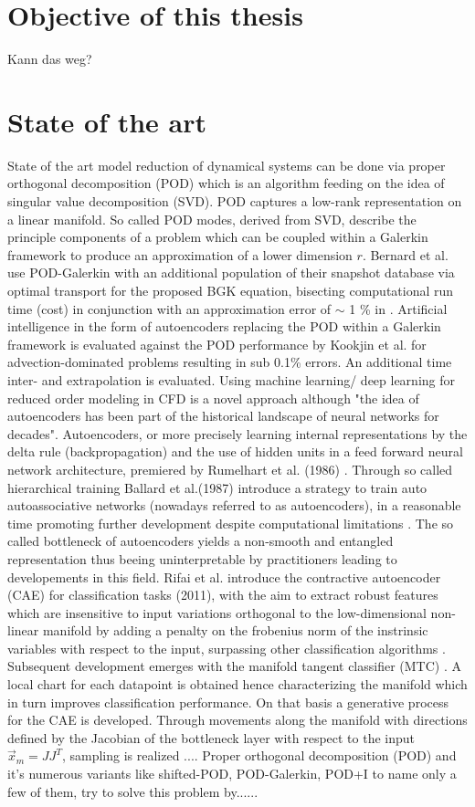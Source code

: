 \section{Objective of this thesis}
Kann das weg?
\section{State of the art}
State of the art model reduction of dynamical systems can be done via proper orthogonal decomposition (POD) which is an algorithm feeding on the idea of singular value decomposition (SVD)\cite{Franz}\cite{Kutz}. POD captures a low-rank representation on a linear manifold. So called POD modes, derived from SVD, describe the principle components of a problem which can be coupled within a Galerkin framework to produce an approximation of a lower dimension \(r\). 
Bernard et al. use POD-Galerkin with an additional population of their snapshot database via optimal transport for the proposed BGK equation, bisecting computational run time (cost) in conjunction with an approximation error of \(\sim\) 1 \% in \cite{Bernard}. Artificial intelligence in the form of autoencoders replacing the POD within a Galerkin framework is evaluated against the POD performance by Kookjin et al. for advection-dominated problems\cite{Carlberg} resulting in sub 0.1\% errors. An additional time inter- and extrapolation is evaluated. Using machine learning/ deep learning for reduced order modeling in CFD is a novel approach although "the idea of autoencoders has been part of the historical landscape of neural networks for decades"\cite[p.493]{Goodfellow}. Autoencoders, or more precisely learning internal representations by the delta rule (backpropagation) and the use of hidden units in a feed forward neural network architecture, premiered by Rumelhart et al. (1986) \cite{Rumelhart}.  Through so called hierarchical training Ballard et al.(1987) introduce a strategy to train auto autoassociative networks (nowadays referred to as autoencoders), in a reasonable time promoting further development despite computational limitations \cite{Ballard}. The so called bottleneck of autoencoders yields a non-smooth and entangled representation thus beeing uninterpretable by practitioners\cite{Rifai2011} leading to developements in this field. Rifai et al. introduce the contractive autoencoder (CAE) for classification tasks (2011), with the aim to extract robust features which are insensitive to input variations orthogonal to the low-dimensional non-linear manifold by adding a penalty on the frobenius norm of the instrinsic variables with respect to the input, surpassing other classification algorithms \cite{Rifai2011}. Subsequent development emerges with the manifold tangent classifier (MTC) \cite{Rifai_2011a}. A local chart for each datapoint is obtained hence characterizing the manifold  which in turn improves classification performance. On that basis a generative process for the CAE is developed. Through movements along the manifold with directions defined by the Jacobian of the bottleneck layer with respect to the input \begin{math}	\vec{x}_m=JJ^T \end{math}, sampling is realized \cite{rifai2012generative}....
Proper orthogonal decomposition (POD) and it's numerous variants like shifted-POD\cite{bibid}, POD-Galerkin\cite{bibid}, POD+I \cite{bibid} to name only a few of them, try to solve this problem by......	